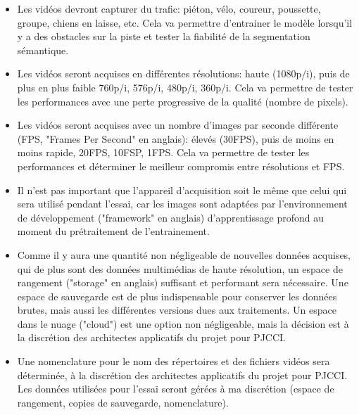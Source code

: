 \begin{itemize}
   \item Les vidéos devront capturer du trafic: piéton, vélo, coureur, poussette, groupe, chiens en laisse, etc. Cela va permettre d'entrainer le modèle lorsqu'il y a des obstacles sur la piste et tester la fiabilité de la segmentation sémantique. 
   \item Les vidéos seront acquises en différentes résolutions: haute (1080p/i), puis de plus en plus faible 760p/i, 576p/i, 480p/i, 360p/i. Cela va permettre de tester les performances avec une perte progressive de la qualité (nombre de pixels).
   \item Les vidéos seront acquises avec un nombre d'images par seconde différente (FPS, "Frames Per Second" en anglais): élevés (30FPS), puis de moins en moins rapide, 20FPS, 10FSP, 1FPS. Cela va permettre de tester les performances et déterminer le meilleur compromis entre résolutions et FPS.
   \item Il n'est pas important que l'appareil d'acquisition soit le même que celui qui sera utilisé pendant l'essai, car les images sont adaptées par l'environnement de développement ("framework" en anglais) d'apprentissage profond au moment du prétraitement de l'entrainement.
   \item Comme il y aura une quantité non négligeable de nouvelles données acquises, qui de plus sont des données multimédias de haute résolution, un espace de rangement ("storage" en anglais) suffisant et performant sera nécessaire. Une espace de sauvegarde est de plus indispensable pour conserver les données brutes, mais aussi les différentes versions dues aux traitements. Un espace dans le nuage ("cloud") est une option non négligeable, mais la décision est à la discrétion des architectes applicatifs du projet pour PJCCI.
   \item Une nomenclature pour le nom des répertoires et des fichiers vidéos sera déterminée, à la discrétion des architectes applicatifs du projet pour PJCCI. Les données utilisées pour l'essai seront gérées à ma discrétion (espace de rangement, copies de sauvegarde, nomenclature).
\end{itemize}
